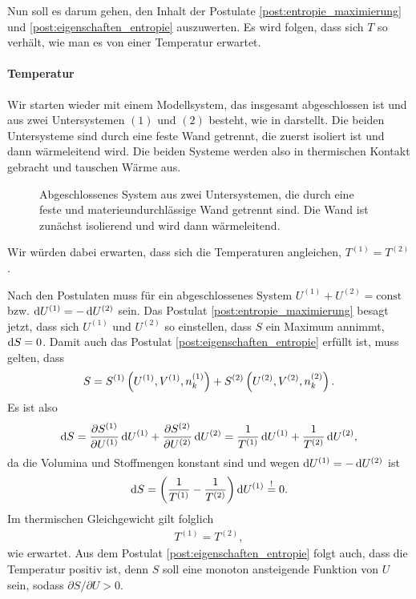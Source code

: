 Nun soll es darum gehen, den Inhalt der Postulate \ref{post:entropie_maximierung} und \ref{post:eigenschaften_entropie} auszuwerten.
Es wird folgen, dass sich $T$ so verhält, wie man es von einer Temperatur erwartet.

\paragraph*{Temperatur}

Wir starten wieder mit einem Modellsystem, das insgesamt abgeschlossen ist und aus zwei Untersystemen $(1)$ und $(2)$ besteht, wie in  darstellt.
Die beiden Untersysteme sind durch eine feste Wand getrennt, die zuerst isoliert ist und dann wärmeleitend wird. Die beiden Systeme werden also in thermischen Kontakt gebracht und tauschen Wärme aus.

\begin{figure}[htbp]
    \centering
    \tfigDoppelsystemUSfesteWaermeleitendeWand
    \caption{Abgeschlossenes System aus zwei Untersystemen, die durch eine feste und materieundurchlässige Wand getrennt sind. Die Wand ist zunächst isolierend und wird dann wärmeleitend.}
    \label{fig:DoppelsystemUSfesteWaermeleitendeWand}
\end{figure}

Wir würden dabei erwarten, dass sich die Temperaturen angleichen, $T^{(1)}=T^{(2)}$.

Nach den Postulaten muss für ein abgeschlossenes System $U^{(1)}+U^{(2)} = \mathrm{const}$ bzw. $\mathop{}\!\mathrm{d} U^{(1)} = -\mathop{}\!\mathrm{d} U^{(2)}$ sein. Das Postulat \ref{post:entropie_maximierung} besagt jetzt, dass sich $U^{(1)}$ und $U^{(2)}$ so einstellen, dass $S$ ein Maximum annimmt, $\mathop{}\!\mathrm{d} S=0$. Damit auch das Postulat \ref{post:eigenschaften_entropie} erfüllt ist, muss gelten, dass
\begin{align*}
    S=S^{(1)}\left(U^{(1)},V^{(1)},n^{(1)}_k\right) + S^{(2)}\left(U^{(2)},V^{(2)},n^{(2)}_k\right).
\end{align*}
Es ist also
\begin{align*}
    \mathop{}\!\mathrm{d} S = \frac{\partial S^{(1)}}{\partial U^{(1)}}\mathop{}\!\mathrm{d} U^{(1)}+ \frac{\partial S^{(2)}}{\partial U^{(2)}}\mathop{}\!\mathrm{d} U^{(2)} = \frac{1}{T^{(1)}}\mathop{}\!\mathrm{d} U^{(1)} + \frac{1}{T^{(2)}}\mathop{}\!\mathrm{d} U^{(2)},
\end{align*}
da die Volumina und Stoffmengen konstant sind und wegen $\mathop{}\!\mathrm{d} U^{(1)} = -\mathop{}\!\mathrm{d} U^{(2)}$ ist
\begin{align*}
    \mathop{}\!\mathrm{d} S = \left(\frac{1}{T^{(1)}}-\frac{1}{T^{(2)}}\right)\mathop{}\!\mathrm{d} U^{(1)} \overset{!}{=} 0.
\end{align*}
Im thermischen Gleichgewicht gilt folglich
\begin{align}
    \label{eq:thermisches_gg_temperatur}
    T^{(1)} = T^{(2)},
\end{align}
wie erwartet. Aus dem Postulat \ref{post:eigenschaften_entropie} folgt auch, dass die Temperatur positiv ist, denn $S$ soll eine monoton ansteigende Funktion von $U$ sein, sodass $\partial S/\partial U > 0$.

